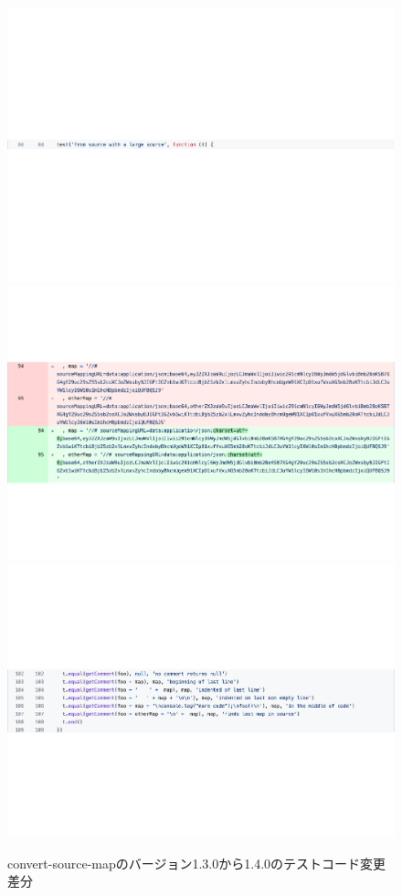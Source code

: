 \documentclass[submit]{ipsj}
\begin{document}
\begin{figure}[t]
  \centering
  \includegraphics[width=1.0\linewidth]{IPSJjournal_maekawa_fig/rq2/source-map-1.pdf}
  \includegraphics[width=1.0\linewidth]{IPSJjournal_maekawa_fig/rq2/source-map-2.pdf}
  \includegraphics[width=1.0\linewidth]{IPSJjournal_maekawa_fig/rq2/source-map-3.pdf}
  \caption{convert-source-mapのバージョン1.3.0から1.4.0のテストコード変更差分}
  \label{fig:rq2.convert-source-map}
\end{figure}
\end{document}
